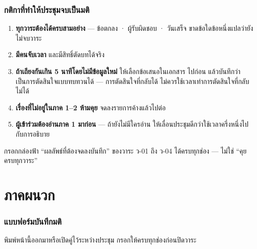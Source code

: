 \section{กติกาที่ทำให้ประชุมจบเป็นมติ}

\begin{enumerate}
\item \textbf{ทุกวาระต้องได้ครบสามอย่าง} --- ข้อตกลง · ผู้รับผิดชอบ · วันเสร็จ
      ขาดข้อใดข้อหนึ่งแปลว่ายังไม่จบวาระ
\item \textbf{มีคนจับเวลา} และมีสิทธิ์ตัดบทได้จริง
\item \textbf{ถ้าเถียงกันเกิน 5 นาทีโดยไม่มีข้อมูลใหม่} ให้เลือกข้อเสนอในเอกสาร
      ไปก่อน แล้วบันทึกว่าเป็นการตัดสินใจแบบทบทวนได้ --- การตัดสินใจที่กลับได้
      ไม่ควรใช้เวลาเท่าการตัดสินใจที่กลับไม่ได้
\item \textbf{เรื่องที่ไม่อยู่ในภาค 1--2 ห้ามคุย} จดลงรายการค้างแล้วไปต่อ
\item \textbf{ผู้เข้าร่วมต้องอ่านภาค 1 มาก่อน} ---
      ถ้ายังไม่มีใครอ่าน ให้เลื่อนประชุมดีกว่าใช้เวลาครึ่งหนึ่งไปกับการอธิบาย
\end{enumerate}

\begin{keybox}[title={สิ่งที่วัดว่าประชุมนี้สำเร็จ}]
กรอกกล่องฟ้า ``ผลลัพธ์ที่ต้องจดลงบันทึก'' ของวาระ ว-01 ถึง ว-04 ได้ครบทุกช่อง
--- ไม่ใช่ ``คุยครบทุกวาระ''
\end{keybox}

\clearpage

\appendix
\part*{ภาคผนวก}

\makeatletter
\newcommand{\thaialph}[1]{\ifcase\value{#1}\or ก\or ข\or ค\or ง\or จ\or ฉ\fi}
\makeatother
\renewcommand{\thesection}{\thaialph{section}}

\section{แบบฟอร์มบันทึกมติ}

พิมพ์หน้านี้ออกมาหรือเปิดคู่ไว้ระหว่างประชุม กรอกให้ครบทุกช่องก่อนปิดวาระ


